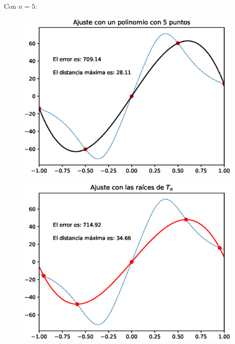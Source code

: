 \documentclass[12pt]{article}
\numberwithin{equation}{section}
\begin{document}
Con $n = 5$:
\\
\begin{minipage}{0.45\linewidth}
    \begin{figure}[H]
    \centering
    \includegraphics[scale=0.44]{Imagenes/Interpolacion_Chebychev_05_Polinomio.eps}
    \end{figure}       
\end{minipage}
\hspace{0.1cm}
\begin{minipage}{0.45\linewidth}
\begin{figure}[H]
    \centering
    \includegraphics[scale=0.44]{Imagenes/Interpolacion_Chebychev_05_Raices.eps}
\end{figure}
\end{minipage}
\end{document}
